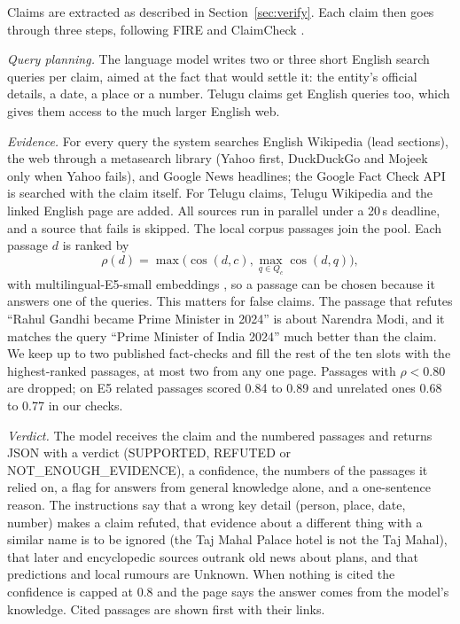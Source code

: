 \documentclass[conference]{IEEEtran}
\begin{document}
Claims are extracted as described in Section~\ref{sec:verify}. Each claim then goes through three steps, following FIRE and ClaimCheck \cite{xie2025fire,putta2025claimcheck}.

\textit{Query planning.} The language model writes two or three short English search queries per claim, aimed at the fact that would settle it: the entity's official details, a date, a place or a number. Telugu claims get English queries too, which gives them access to the much larger English web.

\textit{Evidence.} For every query the system searches English Wikipedia (lead sections), the web through a metasearch library (Yahoo first, DuckDuckGo and Mojeek only when Yahoo fails), and Google News headlines; the Google Fact Check API is searched with the claim itself. For Telugu claims, Telugu Wikipedia and the linked English page are added. All sources run in parallel under a 20\,s deadline, and a source that fails is skipped. The local corpus passages join the pool. Each passage $d$ is ranked by
\begin{equation}
\rho(d) = \max\big(\cos(d,c), \max_{q\in Q_c}\cos(d,q)\big),
\end{equation}
with multilingual-E5-small embeddings \cite{wang2024me5}, so a passage can be chosen because it answers one of the queries. This matters for false claims. The passage that refutes ``Rahul Gandhi became Prime Minister in 2024'' is about Narendra Modi, and it matches the query ``Prime Minister of India 2024'' much better than the claim. We keep up to two published fact-checks and fill the rest of the ten slots with the highest-ranked passages, at most two from any one page. Passages with $\rho<0.80$ are dropped; on E5 related passages scored 0.84 to 0.89 and unrelated ones 0.68 to 0.77 in our checks.

\textit{Verdict.} The model receives the claim and the numbered passages and returns JSON with a verdict (SUPPORTED, REFUTED or NOT\_ENOUGH\_EVIDENCE), a confidence, the numbers of the passages it relied on, a flag for answers from general knowledge alone, and a one-sentence reason. The instructions say that a wrong key detail (person, place, date, number) makes a claim refuted, that evidence about a different thing with a similar name is to be ignored (the Taj Mahal Palace hotel is not the Taj Mahal), that later and encyclopedic sources outrank old news about plans, and that predictions and local rumours are Unknown. When nothing is cited the confidence is capped at 0.8 and the page says the answer comes from the model's knowledge. Cited passages are shown first with their links.
\end{document}
